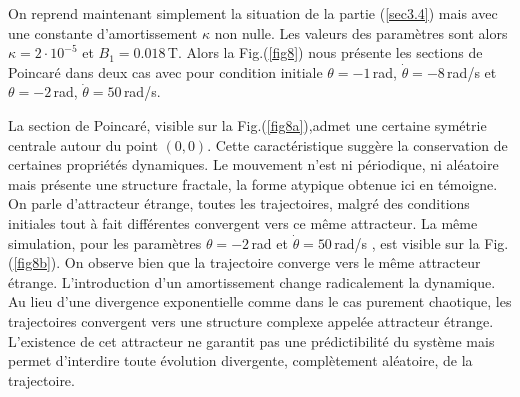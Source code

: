 \documentclass[a4paper,12pt,twoside]{article}
\begin{document}
On reprend maintenant simplement la situation de la partie (\ref{sec3.4}) mais avec une constante d'amortissement $\kappa$ non nulle. Les valeurs des paramètres sont alors $\kappa=2\cdot10^{-5}$ et $B_1=0.018$\,T. Alors la Fig.(\ref{fig8}) nous présente les sections de Poincaré dans deux cas avec pour condition initiale $\theta=-1$\,rad, $\dot{\theta}=-8$\,rad/s et $\theta=-2$\,rad, $\dot{\theta}=50$\,rad/s.

La section de Poincaré, visible sur la Fig.(\ref{fig8a}),admet une certaine symétrie centrale autour du point $(0,0)$. Cette caractéristique suggère la conservation de certaines propriétés dynamiques. Le mouvement n'est ni périodique, ni aléatoire mais présente une structure fractale, la forme atypique obtenue ici en témoigne. On parle d'attracteur étrange, toutes les trajectoires, malgré des conditions initiales tout à fait différentes convergent vers ce même attracteur. La même simulation, pour les paramètres $\theta=-2$\,rad et $\dot{\theta}=50$\,rad/s , est visible sur la Fig.(\ref{fig8b}). On observe bien que la trajectoire converge vers le même attracteur étrange. L’introduction d’un amortissement change radicalement la dynamique. Au lieu d’une divergence exponentielle comme dans le cas purement chaotique, les trajectoires convergent vers une structure complexe appelée attracteur étrange. L'existence de cet attracteur ne garantit pas une prédictibilité du système mais permet d'interdire toute évolution divergente, complètement aléatoire, de la trajectoire.
\end{document}
